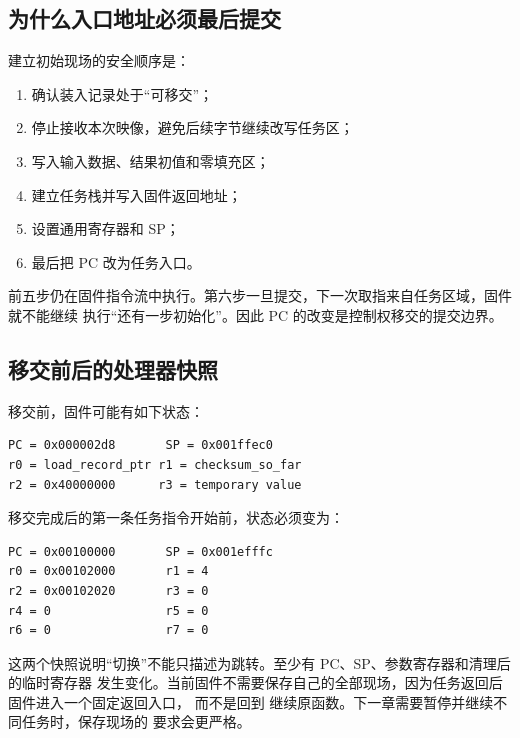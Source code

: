 \subsection{为什么入口地址必须最后提交}

建立初始现场的安全顺序是：

\begin{enumerate}
\item 确认装入记录处于“可移交”；
\item 停止接收本次映像，避免后续字节继续改写任务区；
\item 写入输入数据、结果初值和零填充区；
\item 建立任务栈并写入固件返回地址；
\item 设置通用寄存器和 SP；
\item 最后把 PC 改为任务入口。
\end{enumerate}

前五步仍在固件指令流中执行。第六步一旦提交，下一次取指来自任务区域，固件就不能继续
执行“还有一步初始化”。因此 PC 的改变是控制权移交的提交边界。

\begin{center}
\end{center}

\subsection{移交前后的处理器快照}

移交前，固件可能有如下状态：

\begin{lstlisting}
PC = 0x000002d8       SP = 0x001ffec0
r0 = load_record_ptr r1 = checksum_so_far
r2 = 0x40000000      r3 = temporary value
\end{lstlisting}

移交完成后的第一条任务指令开始前，状态必须变为：

\begin{lstlisting}
PC = 0x00100000       SP = 0x001efffc
r0 = 0x00102000       r1 = 4
r2 = 0x00102020       r3 = 0
r4 = 0                r5 = 0
r6 = 0                r7 = 0
\end{lstlisting}

这两个快照说明“切换”不能只描述为跳转。至少有 PC、SP、参数寄存器和清理后的临时寄存器
发生变化。当前固件不需要保存自己的全部现场，因为任务返回后固件进入一个固定返回入口，
而不是回到  继续原函数。下一章需要暂停并继续不同任务时，保存现场的
要求会更严格。
